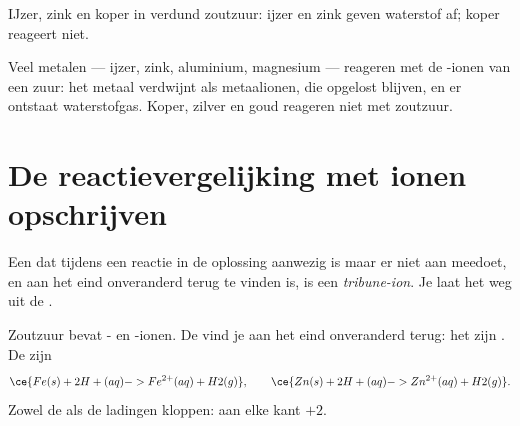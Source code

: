 \begin{omfigure}

{\small IJzer, zink en koper in verdund zoutzuur: ijzer en zink geven
waterstof af; koper reageert niet.}
\end{omfigure}

\begin{proposition}\label{prop:g9:metals-acids-corrosion:acid}
Veel metalen --- ijzer, zink, aluminium, magnesium --- reageren met de
-ionen van een zuur: het metaal verdwijnt als metaalionen, die
opgelost blijven, en er ontstaat waterstofgas. Koper, zilver en goud
reageren niet met zoutzuur.
\end{proposition}

\section{De reactievergelijking met ionen opschrijven}

\begin{definition}\label{def:g9:metals-acids-corrosion:spectator}
Een  dat tijdens een reactie in de oplossing aanwezig is maar er niet
aan meedoet, en aan het eind onveranderd terug te vinden is, is een
\emph{tribune-ion}. Je laat het weg uit de
.
\end{definition}

\begin{example}\label{ex:g9:metals-acids-corrosion:iron}
Zoutzuur bevat - en -ionen. De  vind
je aan het eind onveranderd terug: het zijn . De
 zijn
\[
  \ce{Fe(s) + 2H+(aq) -> Fe^{2+}(aq) + H2(g)}, \qquad
  \ce{Zn(s) + 2H+(aq) -> Zn^{2+}(aq) + H2(g)}.
\]
Zowel de  als de ladingen kloppen: aan elke kant $+2$.
\end{example}

